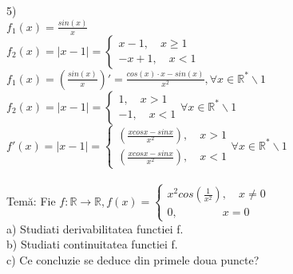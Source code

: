 \documentclass[12pt]{extarticle}
\begin{document}
{		5) \\
		$f_{1}(x) = \frac{sin(x)}{x}$ \\
		$f_{2}(x) = |x - 1| = 
		\left\{\begin{matrix}
		x - 1, \quad x \geq 1 \\ 
		-x + 1, \quad x < 1
		\end{matrix}\right.
		$ \\
		$f_{1}(x) = (\frac{sin(x)}{x})' = \frac{cos(x) \cdot x - sin(x)}{x^{2}}, \forall x \in \mathbb{R}^{*} \backslash {1}$ \\
		$f_{2}(x) = |x - 1| = 
		\left\{\begin{matrix}
		1, \quad x > 1 \\ 
		-1, \quad x < 1
		\end{matrix}\right. \forall x \in \mathbb{R}^{*} \backslash {1}$ \\
		$f'(x) = |x - 1| = 
		\left\{\begin{matrix}
		(\frac{xcosx - sinx}{x^{2}}), \quad x > 1 \\ 
		(\frac{xcosx - sinx}{x^{2}}), \quad x < 1
		\end{matrix}\right. \forall x \in \mathbb{R}^{*} \backslash {1}$ \\
		\\
		Temă: Fie $f : \mathbb{R} \to \mathbb{R}, f(x) = 
		\left\{\begin{matrix}
		x^{2}cos(\frac{1}{x^{2}}), \quad x \neq 0 \\ 
		0, \quad\quad\quad\quad x = 0
		\end{matrix}\right.$\\
		a) Studiati derivabilitatea functiei f. \\
		b) Studiati continuitatea functiei f. \\
		c) Ce concluzie se deduce din primele doua puncte? \\
	}
	
	
\end{document}
